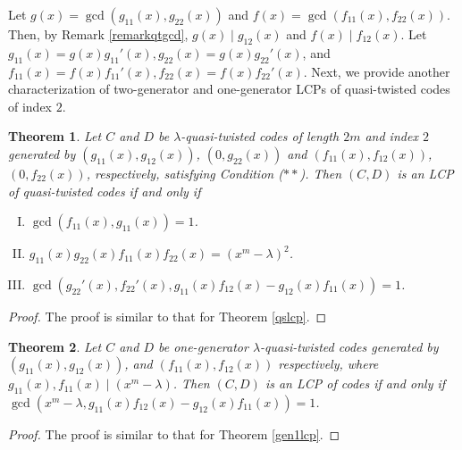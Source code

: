 \documentclass[12 pt]{extarticle}
\numberwithin{equation}{section}
\newtheorem{theorem}{Theorem}[section]
\theoremstyle{definition}
\begin{document}
Let $g(x)=\gcd(g_{11}(x),g_{22}(x))$ and $f(x)=\gcd(f_{11}(x),f_{22}(x))$. Then, by Remark \ref{remarkqtgcd}, $g(x)\mid g_{12}(x)$ and $f(x)\mid f_{12}(x)$. Let $g_{11}(x)=g(x)   g_{11}'(x), g_{22}(x)=g(x) g_{22}'(x)$, and $f_{11}(x)=f(x)   f_{11}'(x), f_{22}(x)=f(x) f_{22}'(x)$.
 Next, we provide another characterization of two-generator and one-generator LCPs of quasi-twisted codes of index $2$. 

\begin{theorem}\label{qtslcp}
Let $C$ and $D$ be  $\lambda$-quasi-twisted codes of length $2m$ and index $2$ generated by $(g_{11}(x),g_{12}(x))$, $(0,g_{22}(x))$ and $(f_{11}(x),f_{12}(x))$, $(0,f_{22}(x))$, respectively, satisfying Condition ($\ast\ast$). Then $(C,D)$ is an LCP of quasi-twisted codes if and only if 
	\begin{enumerate}[(I)]
       \item  $\gcd(f_{11}(x),g_{11}(x))=1$.
		\item  $g_{11}(x)g_{22}(x)f_{11}(x)f_{22}(x)=(x^m-\lambda)^2$.
		\item $\gcd(g_{22}'(x),f_{22}'(x), g_{11}(x)f_{12}(x)-g_{12}(x)f_{11}(x))=1$.
	\end{enumerate}
\end{theorem}
\begin{proof}
    The proof is similar to that for  Theorem \ref{qslcp}.
\end{proof}

\begin{theorem}\label{gen1qtlcp}
Let $C$ and $D$ be one-generator $\lambda$-quasi-twisted codes generated by $(g_{11}(x),g_{12}(x))$, and $(f_{11}(x),f_{12}(x))$ respectively, where $g_{11}(x),f_{11}(x) \mid (x^m-\lambda)$. Then $(C,D)$ is an LCP of codes if and only if $\gcd (x^m-\lambda, g_{11}(x)f_{12}(x)-g_{12}(x)f_{11}(x))=1$.
\end{theorem}

\begin{proof}
    The proof is similar to that for Theorem \ref{gen1lcp}.
\end{proof}
\end{document}
